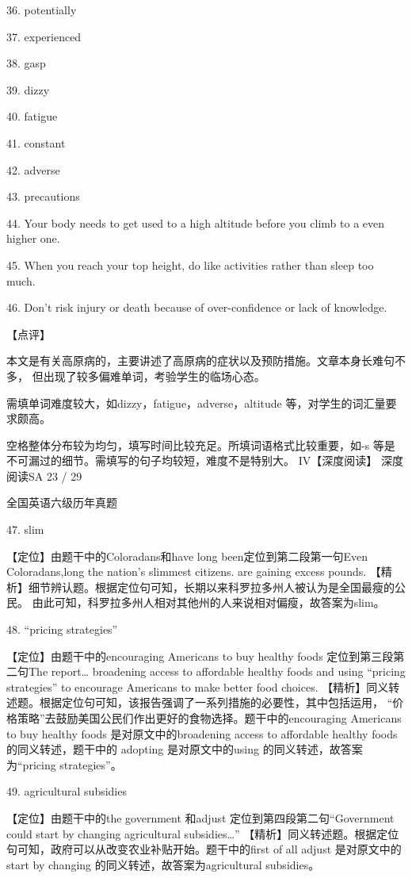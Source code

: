 \documentclass[UTF8,11pt]{ctexart}
\begin{document}
36. potentially


37. experienced


38. gasp


39. dizzy


40. fatigue


41. constant


42. adverse


43. precautions


44. Your body needs to get used to a high altitude before you climb to a even higher one.


45. When you reach your top height, do like activities rather than sleep too much.


46. Don’t risk injury or death because of over-confidence or lack of knowledge.


【点评】


本文是有关高原病的，主要讲述了高原病的症状以及预防措施。文章本身长难句不多， 但出现了较多偏难单词，考验学生的临场心态。


需填单词难度较大，如dizzy，fatigue，adverse，altitude 等，对学生的词汇量要求颇高。


空格整体分布较为均匀，填写时间比较充足。所填词语格式比较重要，如-s 等是不可漏过的细节。需填写的句子均较短，难度不是特别大。 IV【深度阅读】 深度阅读SA 23 / 29


全国英语六级历年真题


47. slim


【定位】由题干中的Coloradans和have long been定位到第二段第一句Even Coloradans,long the nation's slimmest citizens. are gaining excess pounds. 【精析】细节辨认题。根据定位句可知，长期以来科罗拉多州人被认为是全国最瘦的公民。 由此可知，科罗拉多州人相对其他州的人来说相对偏瘦，故答案为slim。


48. “pricing strategies”


【定位】由题干中的encouraging Americans to buy healthy foods 定位到第三段第二句The report… broadening access to affordable healthy foods and using “pricing strategies” to encourage Americans to make better food choices. 【精析】同义转述题。根据定位句可知，该报告强调了一系列措施的必要性，其中包括运用， “价格策略”去鼓励美国公民们作出更好的食物选择。题干中的encouraging Americans to buy healthy foods 是对原文中的broadening access to affordable healthy foods 的同义转述，题干中的 adopting 是对原文中的using 的同义转述，故答案为“pricing strategies”。


49. agricultural subsidies


【定位】由题干中的the government 和adjust 定位到第四段第二句“Government could start by changing agricultural subsidies…” 【精析】同义转述题。根据定位句可知，政府可以从改变农业补贴开始。题干中的first of all adjust 是对原文中的start by changing 的同义转述，故答案为agricultural subsidies。
\end{document}
